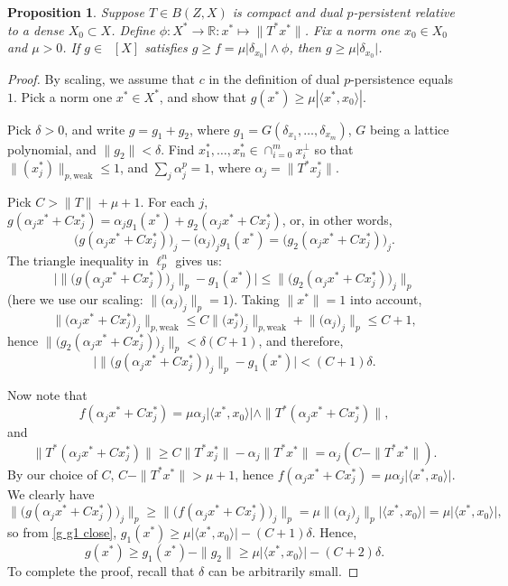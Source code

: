 \documentclass{amsart}
\theoremstyle{plain}
\newtheorem{proposition}[theorem]{Proposition}
\theoremstyle{definition}
\numberwithin{equation}{section}
\newcommand{\R}{\mathbb{R}}
\DeclareMathOperator{\FBLp}{FBL^{\mathit{(p)}}}
\begin{document}
\begin{proposition}\label{supremum in FBL}
Suppose $T \in B(Z,X)$ is compact and dual $p$-persistent relative to a dense $X_0 \subset X$. Define $\phi : X^* \to \R : x^* \mapsto \|T^*x^*\|$. Fix a norm one $x_0 \in X_0$ and $\mu > 0$. If $g \in \FBLp[X]$ satisfies $g \geq f = \mu \big| \delta_{x_0} \big| \wedge \phi$, then $g \geq \mu \big| \delta_{x_0} \big|$.
\end{proposition}

\begin{proof}
By scaling, we assume that $c$ in the definition of dual $p$-persistence equals $1$.
Pick a norm one $x^* \in X^*$, and show that $g(x^*) \geq \mu |\langle x^*, x_0\rangle|$. 

Pick $\delta > 0$, and write $g = g_1 + g_2$, where $g_1 = G(\delta_{x_1}, \ldots, \delta_{x_m})$, $G$ being a lattice polynomial, and $\|g_2\| < \delta$.
Find $x_1^*, \ldots, x_n^* \in \cap_{i=0}^m x_i^\perp$ so that $\|(x_j^*)\|_{p,{\textrm{weak}}} \leq 1$, and $\sum_j \alpha_j^p = 1$, where $\alpha_j = \|T^* x_j^*\|$.

Pick $C > \|T\| + \mu + 1$. For each $j$, $g(\alpha_j x^* + C x_j^*) = \alpha_j g_1(x^*) + g_2(\alpha_j x^* + C x_j^*)$, or, in other words,
$$
\big( g(\alpha_j x^* + C x_j^*) \big)_j - \big( \alpha_j \big)_j g_1(x^*) = \big( g_2(\alpha_j x^* + C x_j^*) \big)_j .
$$
The triangle inequality in $\ell_p^n$ gives us:
$$
\Big|\big\| \big( g(\alpha_j x^* + C x_j^*) \big)_j \big\|_p - g_1(x^*) \Big| \leq \big\| \big( g_2(\alpha_j x^* + C x_j^*) \big)_j \big\|_p 
$$
(here we use our scaling: $\big\| \big( \alpha_j \big)_j \big\|_p = 1$). Taking $\|x^*\| = 1$ into account,
$$
\big\| \big( \alpha_j x^* + C x_j^* \big)_j \big\|_{p, {\textrm{weak}}} \leq C \big\| \big( x_j^* \big)_j \big\|_{p, {\textrm{weak}}} + \big\| \big( \alpha_j \big)_j \big\|_p \leq C+1 ,
$$
hence $\big\| \big( g_2(\alpha_j x^* + C x_j^*) \big)_j \big\|_p < \delta (C+1)$, and therefore,
\begin{equation}
\Big|\big\| \big( g(\alpha_j x^* + C x_j^*) \big)_j \big\|_p - g_1(x^*) \Big| < (C+1)\delta .
\label{g g1 close}
\end{equation}

Now note that
$$
f(\alpha_j x^* + C x_j^*) = \mu \alpha_j \big| \langle x^*, x_0 \rangle \big| \wedge \|T^* (\alpha_j x^* + C x_j^*)\| ,
$$
and
$$
\|T^* (\alpha_j x^* + C x_j^*)\| \geq C \|T^* x_j^*\| - \alpha_j \|T^* x^*\| = \alpha_j (C - \|T^*x^*\|) .
$$
By our choice of $C$, $C - \|T^*x^*\| > \mu + 1$, hence $f(\alpha_j x^* + C x_j^*) = \mu \alpha_j \big| \langle x^*, x_0 \rangle \big|$. We clearly have
$$
\big\| \big( g(\alpha_j x^* + C x_j^*) \big)_j \big\|_p \geq \big\| \big( f(\alpha_j x^* + C x_j^*) \big)_j \big\|_p = \mu \big\| \big( \alpha_j \big)_j \big\|_p \big| \langle x^*, x_0 \rangle \big| = \mu \big| \langle x^*, x_0 \rangle \big| ,
$$
so from \eqref{g g1 close}, $g_1(x^*) \geq \mu \big| \langle x^*, x_0 \rangle \big| - (C+1)\delta$. Hence,
$$
g(x^*) \geq g_1(x^*) - \|g_2\| \geq \mu \big| \langle x^*, x_0 \rangle \big| - (C+2)\delta .
$$
To complete the proof, recall that $\delta$ can be arbitrarily small.
\end{proof}
\end{document}

